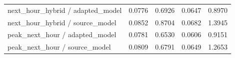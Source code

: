 {\begin{longtable}{@{}p{}p{}p{}p{}p{}@{}}
next\_\allowbreak{}hour\_\allowbreak{}hybrid / adapted\_\allowbreak{}model & 0.0776 & 0.6926 & 0.0647 & 0.8970 \\
next\_\allowbreak{}hour\_\allowbreak{}hybrid / source\_\allowbreak{}model & 0.0852 & 0.8704 & 0.0682 & 1.3945 \\
peak\_\allowbreak{}next\_\allowbreak{}hour / adapted\_\allowbreak{}model & 0.0781 & 0.6530 & 0.0606 & 0.9151 \\
peak\_\allowbreak{}next\_\allowbreak{}hour / source\_\allowbreak{}model & 0.0809 & 0.6791 & 0.0649 & 1.2653 \\
\end{longtable}
}
